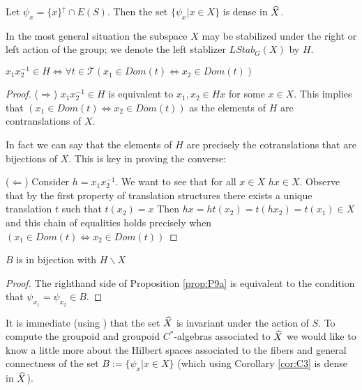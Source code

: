 \begin{corollary}
\begin{corollary}\label{cor:C3}
Let $\psi_{x} = \lbrace x \rbrace^{\uparrow} \cap E(S)$. Then the set $\lbrace \psi_{x} | x \in X \rbrace$ is dense in $\widehat{X}$.
\end{corollary}

In the most general situation the subspace $X$ may be stabilized under the right or left action of the group; we denote the left stablizer $LStab_{G}(X)$ by $H$. 

\begin{proposition}\label{prop:P9a}
$x_{1}x_{2}^{-1} \in H \Leftrightarrow \forall t \in \mathcal{T} (x_{1} \in Dom(t) \Leftrightarrow x_{2} \in Dom(t))$
\end{proposition}
\begin{proof}
($\Rightarrow$) $x_{1}x_{2}^{-1} \in H$ is equivalent to $x_{1}, x_{2} \in Hx$ for some $x \in X$. This implies that $(x_{1} \in Dom(t) \Leftrightarrow x_{2} \in Dom(t))$ as the elements of $H$ are contranslations of $X$. 

In fact we can say that the elements of $H$ are precisely the cotranslations that are bijections of $X$. This is key in proving the converse:

($\Leftarrow$) Consider $h=x_{1}x_{2}^{-1}$. We want to see that for all $x \in X$ $hx \in X$. Observe that by the first property of translation structures there exists a unique translation $t$ such that $t(x_{2})=x$ Then $hx=ht(x_{2})=t(hx_{2})=t(x_{1}) \in X$ and this chain of equalities holds precisely when $(x_{1} \in Dom(t) \Leftrightarrow x_{2} \in Dom(t))$

\end{proof}

\begin{corollary}\label{cor:C5}
$B$ is in bijection with $H \backslash X$
\end{corollary}
\begin{proof}
The righthand side of Proposition \ref{prop:P9a} is equivalent to the condition that $\psi_{x_{1}}=\psi_{x_{2}} \in B$.
\end{proof}

It is immediate (using \cite[Prop 10.10]{MR2419901}) that the set $\widehat{X}$ is invariant under the action of $S$. To compute the groupoid and groupoid $C^{*}$-algebras associated to $\widehat{X}$ we would like to know a little more about the Hilbert spaces associated to the fibers and general connectness of the set $B:=\lbrace \psi_{x} | x \in X \rbrace$ (which using Corollary \ref{cor:C3} is dense in $\widehat{X}$).


\end{corollary}
